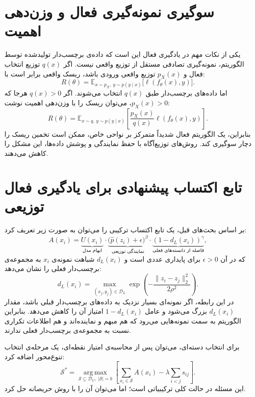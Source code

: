 \documentclass[12pt,a4paper,oneside]{report}
\newcommand{\E}{\mathbb{E}}
\newcommand{\cD}{\mathcal{D}}
\newcommand{\cS}{\mathcal{S}}
\newcommand{\argmax}{\operatorname*{arg\,max}}
\begin{document}
\section{سوگیری نمونه‌گیری فعال و وزن‌دهی اهمیت}
\label{sec:dal_bias}

یکی از نکات مهم در یادگیری فعال این است که داده‌ی برچسب‌دار تولیدشده توسط الگوریتم، نمونه‌گیری تصادفی مستقل از توزیع واقعی نیست. اگر $q(x)$ توزیع انتخاب فعال و $p_X(x)$ توزیع واقعی ورودی باشد، ریسک واقعی برابر است با:
\begin{equation}
R(\theta)=\E_{x\sim p_X,\ y\sim p(y\mid x)}\big[\ell(f_\theta(x),y)\big].
\end{equation}
اما داده‌های برچسب‌دار طبق $q(x)$ انتخاب می‌شوند. اگر $q(x)>0$ هرجا که $p_X(x)>0$، می‌توان ریسک را با وزن‌دهی اهمیت نوشت:
\begin{equation}
R(\theta)=\E_{x\sim q,\ y\sim p(y\mid x)}
\left[\frac{p_X(x)}{q(x)}\ell(f_\theta(x),y)\right].
\end{equation}
بنابراین، یک الگوریتم فعال شدیداً متمرکز بر نواحی خاص، ممکن است تخمین ریسک را دچار سوگیری کند. روش‌های توزیع‌آگاه با حفظ نمایندگی و پوشش داده‌ها، این مشکل را کاهش می‌دهند.

\section{تابع اکتساب پیشنهادی برای یادگیری فعال توزیعی}
\label{sec:dal_proposed_acquisition}

بر اساس بحث‌های قبل، یک تابع اکتساب ترکیبی را می‌توان به صورت زیر تعریف کرد:
\begin{equation}
A(x_i)=
\underbrace{U(x_i)}_{\text{ابهام مدل}}
\cdot
\underbrace{\big(\widehat p(z_i)+\epsilon\big)^\beta}_{\text{نمایندگی توزیعی}}
\cdot
\underbrace{\left(1-d_L(x_i)\right)^\gamma}_{\text{فاصله از دانسته‌های فعلی}},
\label{eq:proposed_score}
\end{equation}
که در آن $\epsilon>0$ برای پایداری عددی است و $d_L(x_i)$ شباهت نمونه‌ی $x_i$ به مجموعه‌ی برچسب‌دار فعلی را نشان می‌دهد:
\begin{equation}
d_L(x_i)=\max_{(x_j,y_j)\in\cD_L}
\exp\left(-\frac{\|z_i-z_j\|_2^2}{2\rho^2}\right).
\end{equation}
در این رابطه، اگر نمونه‌ای بسیار نزدیک به داده‌های برچسب‌دار قبلی باشد، مقدار $d_L(x_i)$ بزرگ می‌شود و عامل $1-d_L(x_i)$ امتیاز آن را کاهش می‌دهد. بنابراین الگوریتم به سمت نمونه‌هایی می‌رود که هم مبهم و نماینده‌اند و هم اطلاعات تکراری نسبت به مجموعه‌ی برچسب‌دار فعلی ندارند.

برای انتخاب دسته‌ای، می‌توان پس از محاسبه‌ی امتیاز نقطه‌ای، یک مرحله‌ی انتخاب تنوع‌محور اضافه کرد:
\begin{equation}
\cS^*=\argmax_{\cS\subseteq\cD_U,\ |\cS|=b}
\left[
\sum_{x_i\in\cS}A(x_i)-\lambda\sum_{i<j}s_{ij}
\right].
\label{eq:final_batch_score}
\end{equation}
این مسئله در حالت کلی ترکیبیاتی است؛ اما می‌توان آن را با روش حریصانه حل کرد.
\end{document}
